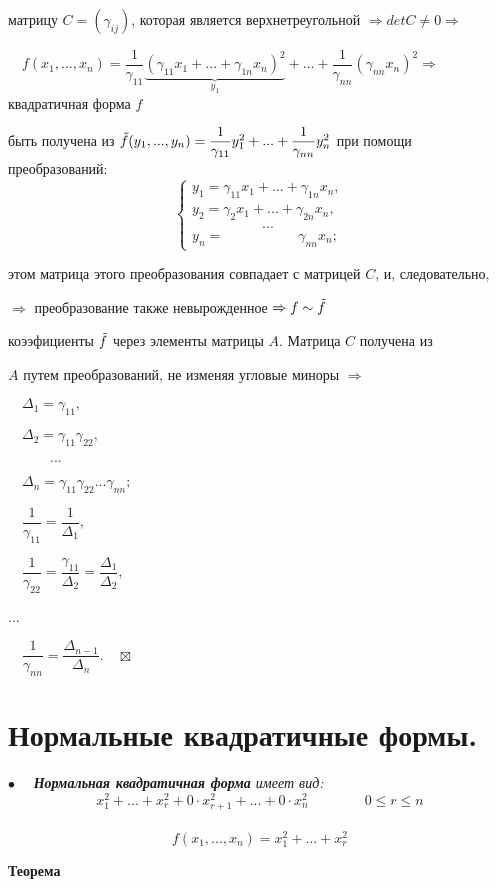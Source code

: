 \documentclass[a4paper, 12pt]{report}
\begin{document}
	 матрицу $C = (\gamma_{ij})$, которая является верхнетреугольной $\Rightarrow detC \ne 0\Rightarrow $
	
	$\quad f(x_1,...,x_n) = \dfrac{1}{\gamma_{11}}\underbrace{(\gamma_{11}x_1 + ...+\gamma_{1n}x_n)^2}_{y_1} + ... + \dfrac{1}{\gamma_{nn}}(\gamma_{nn}x_n)^2\Rightarrow$ квадратичная форма $f$ 
	
	 быть получена из $\Tilde{f}(y_1,...,y_n) = \dfrac{1}{\gamma_{11}}y_1^2+...+\dfrac{1}{\gamma_{nn}}y_n^2$ при помощи преобразований:
	$$\begin{cases} y_1 = \gamma_{11}x_1 + ... + \gamma_{1n}x_n,\\
		y_2 = \gamma_{2}x_1 + ... + \gamma_{2n}x_n,\\
		\qquad\qquad\quad...\\
		y_n = \qquad\qquad\quad\;\gamma_{nn}x_n;
	\end{cases}$$
	
	 этом матрица этого преобразования совпадает с матрицей $C$, и, следовательно, 
	
	 $\Rightarrow$ преобразование также невырожденное $\Rightarrow f\sim \Tilde{f}$ 
	
	 коээфициенты $\Tilde{f}$ через элементы матрицы $A$. Матрица $C$ получена из 
	
	 $A$ путем преобразований, не изменяя угловые миноры $\Rightarrow$
	
	$\quad\Delta_1 = \gamma_{11},$
	
	$\quad\Delta_2 = \gamma_{11}\gamma_{22},$ 
	
	$\quad\qquad...$
	
	$\quad\Delta_n = \gamma_{11}\gamma_{22}...\gamma_{nn};$
	\par\bigskip
	$\quad\dfrac{1}{\gamma_{11}}=\dfrac{1}{\Delta_1},$
	
	$\quad\dfrac{1}{\gamma_{22}}=\dfrac{\gamma_{11}}{\Delta_2} = \dfrac{\Delta_1}{\Delta_2}$,
	
	\quad\qquad ...
	
	$\quad\dfrac{1}{\gamma_{nn}} = \dfrac{\Delta_{n-1}}{\Delta_n}.\quad\boxtimes$
	
	
	
	
	
	
	
	
	
	
	\section{Нормальные квадратичные формы.}
	$\bullet\quad$ \textit{\textbf{Нормальная квадратичная форма} имеет вид:}\\
	$$x_1^2+...+x_r^2+0\cdot x_{r+1}^2+...+0\cdot x_n^2\qquad\qquad0\le r\le n$$ \\
	$$f(x_1,...,x_n)=x_1^2+...+x_r^2$$
	\par\bigskip
	\textbf{Теорема}
	
\end{document}
